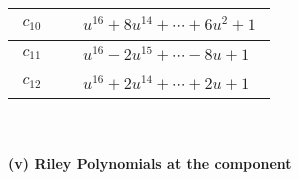 \documentclass[1p]{elsarticle_modified}
\theoremstyle{definition}
\begin{document}
\begin{tabular}{m{50pt}|m{274pt}}
\hline $$\begin{aligned}c_{10}\end{aligned}$$&$\begin{aligned}
&u^{16}+8 u^{14}+\cdots+6 u^2+1
\end{aligned}$\\
\hline $$\begin{aligned}c_{11}\end{aligned}$$&$\begin{aligned}
&u^{16}-2 u^{15}+\cdots-8 u+1
\end{aligned}$\\
\hline $$\begin{aligned}c_{12}\end{aligned}$$&$\begin{aligned}
&u^{16}+2 u^{14}+\cdots+2 u+1
\end{aligned}$\\
\hline
\end{tabular}\\~\\
\newpage\renewcommand{\arraystretch}{1}
\flushleft \textbf{(v) Riley Polynomials at the component}\newline \\
\end{document}
